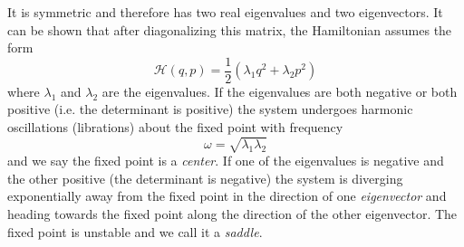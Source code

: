 \documentclass[ twoside,openright,titlepage,numbers=noenddot,headinclude,%
                footinclude=true,cleardoublepage=empty,abstractoff, %
                BCOR=5mm,paper=a4,fontsize=11pt,%
                american,%
                ]{scrreprt}
\begin{document}
It is symmetric and therefore has two real 
eigenvalues and two eigenvectors. It can be shown that after 
diagonalizing this matrix, the Hamiltonian assumes the form
\begin{equation}
    \mathcal{H}(q,p)= \frac{1}{2} (\lambda_1 q^2 + \lambda_2 p^2)
\end{equation}
where $\lambda_1$ and $\lambda_2$ are the eigenvalues. If the
eigenvalues are both negative or both positive (i.e. the
determinant is positive) the system undergoes
harmonic oscillations (librations) about the fixed point with 
frequency
\begin{equation}
    \omega = \sqrt{\lambda_1\lambda_2}
\end{equation}
and we say the fixed point is a \emph{center}. If one of the 
eigenvalues is negative and the other positive (the determinant
is negative) the system is
diverging exponentially away from the fixed point in the 
direction of one \emph{eigenvector} and heading towards the 
fixed point along the direction of the other eigenvector. The
fixed point is unstable and we call it a \emph{saddle}.
\end{document}
